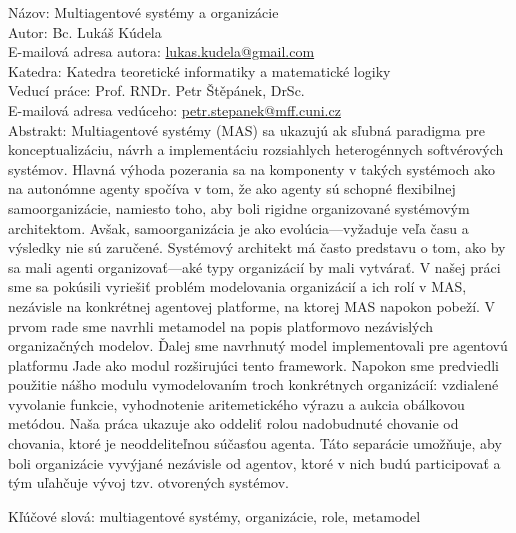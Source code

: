 
\frenchspacing

Názov: Multiagentové systémy a organizácie\\
Autor: Bc. Lukáš Kúdela\\
E-mailová adresa autora: \url{lukas.kudela@gmail.com}\\
Katedra: Katedra teoretické informatiky a matematické logiky\\
Veducí práce: Prof. RNDr. Petr Štěpánek, DrSc.\\
E-mailová adresa vedúceho: \url{petr.stepanek@mff.cuni.cz}\\

Abstrakt: Multiagentové systémy (MAS) sa ukazujú ak sľubná paradigma pre konceptualizáciu, návrh a implementáciu rozsiahlych heterogénnych softvérových systémov.
Hlavná výhoda pozerania sa na komponenty v takých systémoch ako na autonómne agenty spočíva v tom, že ako agenty sú schopné flexibilnej samoorganizácie, namiesto toho, aby boli rigidne organizované systémovým architektom.
Avšak, samoorganizácia je ako evolúcia---vyžaduje veľa času a výsledky nie sú zaručené.
Systémový architekt má často predstavu o tom, ako by sa mali agenti organizovať---aké typy organizácií by mali vytvárať.
V našej práci sme sa pokúsili vyriešiť problém modelovania organizácií a ich rolí v MAS, nezávisle na konkrétnej agentovej platforme, na ktorej MAS napokon pobeží.
V prvom rade sme navrhli metamodel na popis platformovo nezávislých organizačných modelov.
Ďalej sme navrhnutý model implementovali pre agentovú platformu Jade ako modul rozširujúci tento framework.
Napokon sme predviedli použitie nášho modulu vymodelovaním troch konkrétnych organizácií: vzdialené vyvolanie funkcie, vyhodnotenie aritemetického výrazu a aukcia obálkovou metódou. 
Naša práca ukazuje ako oddeliť rolou nadobudnuté chovanie od chovania, ktoré je neoddeliteľnou súčasťou agenta.
Táto separácie umožňuje, aby boli organizácie vyvýjané nezávisle od agentov, ktoré v nich budú participovať a tým uľahčuje vývoj tzv. otvorených systémov.

Kľúčové slová: multiagentové systémy, organizácie, role, metamodel

\nonfrenchspacing